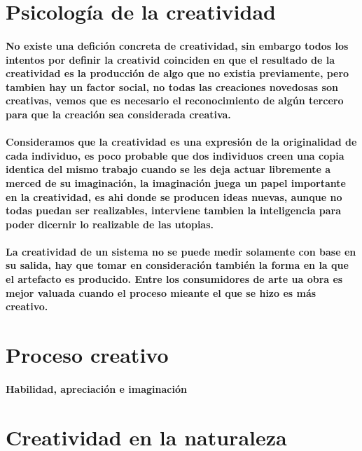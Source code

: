 \section {Psicología de la creatividad}
\paragraph {No existe una defición concreta de creatividad, sin embargo todos los intentos por definir la creativid coinciden en que el resultado de la creatividad es la producción de algo que no existia previamente, pero tambien hay un factor social, no todas las creaciones novedosas son creativas, vemos que es necesario el reconocimiento de algún tercero para que la creación sea considerada creativa.}

\paragraph {Consideramos que la creatividad es una expresión de la originalidad de cada individuo, es poco probable que dos individuos creen una copia identica del mismo trabajo cuando se les deja actuar libremente a merced de su imaginación, la imaginación juega un papel importante en la creatividad, es ahi donde se producen ideas nuevas, aunque no todas puedan ser realizables, interviene tambien la inteligencia para poder dicernir lo realizable de las utopias.}

\paragraph {La creatividad de un sistema no se puede medir solamente con base en su salida, hay que tomar en consideración también la forma en la que el artefacto es producido. Entre los consumidores de arte ua obra es mejor valuada cuando el proceso mieante el que se hizo es más creativo. \cite{simon-colton}}

\section{Proceso creativo}

\paragraph{Habilidad, apreciación  e imaginación}
\section{Creatividad en la naturaleza}
